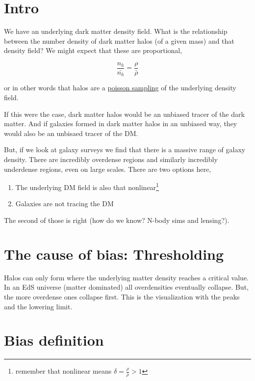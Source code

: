 \documentclass{article}
\begin{document}
\section{Intro}

We have an underlying dark matter density field. What is the relationship between the number density of dark matter halos (of a given mass) and that density field?
We might expect that these are proportional,

\begin{equation}
    \frac{n_h}{\bar{n_h}} = \frac{\rho}{\bar{\rho}}
\end{equation}

\noindent or in other words that halos are a \href{https://en.wikipedia.org/wiki/Poisson_sampling}{poisson sampling} of the underlying density field.

If this were the case, dark matter halos would be an unbiased tracer of the dark matter. And if galaxies formed in dark matter halos in an unbiased way, they would also be an unbisaed tracer of the DM\@.

But, if we look at galaxy surveys we find that there is a massive range of galaxy density. There are incredibly overdense regions and similarly incredibly underdense regions, even on large scales.
There are two options here,
\begin{enumerate}
    \item The underlying DM field is also that nonlinear\footnote{remember that nonlinear means $\delta = \frac{\rho}{\bar{\rho}} > 1$}
    \item Galaxies are not tracing the DM
\end{enumerate}

The second of those is right (how do we know? N-body sims and lensing?).

\section{The cause of bias: Thresholding}

Halos can only form where the underlying matter density reaches a critical value.
In an EdS universe (matter dominated) all overdensities eventually collapse.
But, the more overdense ones collapse first.
This is the visualization with the peaks and the lowering limit.


\section{Bias definition}
\end{document}
